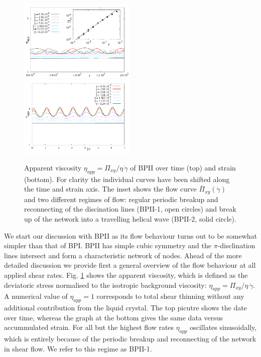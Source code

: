 \documentclass[aps,pre,reprint,superscriptaddress, twocolumn]{revtex4}
\newcommand{\gd}{\dot{\gamma}}
\begin{document}
\begin{figure}[htpb]
\includegraphics[width=0.495\textwidth]{stress_bp2.pdf}
\includegraphics[width=0.495\textwidth]{stress_vs_strain_bp2.pdf}
\caption{Apparent viscosity $\eta_{app}=\Pi_{xy}/\eta\,\gd$ of BPII over time (top) and strain (bottom). 
For clarity the individual curves have been shifted along the time and strain axis. 
The inset shows the flow curve $\bar{\Pi}_{xy}(\gd)$ and two different regimes of flow: 
regular periodic breakup and reconnecting of the discination lines (BPII-1, open circles) 
and break up of the network into a travelling helical wave (BPII-2, solid circle).}
\label{bp2-rheo}
\end{figure}

We start our discussion with BPII as its flow behaviour turns out to be somewhat simpler 
than that of BPI. BPII has simple cubic symmetry and the $\pi$-disclination lines intersect and form a characteristic network of nodes.
Ahead of the more detailed discussion we provide first a general overview of the flow behaviour at all applied shear rates.
Fig. \ref{bp2-rheo} shows the apparent viscosity, which is defined as the 
deviatoric stress normalised to the isotropic background viscosity: 
$\eta_{app}=\Pi_{xy}/\eta\,\gd$.
A numerical value of $\eta_{app}=1$ corresponds to total shear thinning without 
any additional contribution from the liquid crystal.
The top picutre shows the date over time, whereas the graph at the bottom gives 
the same data versus accummulated strain.
For all but the highest flow rates $\eta_{app}$ oscillates sinusoidally, which
is entirely because of the periodic breakup and reconnecting of the network in shear flow. We refer to this regime as BPII-1.
\end{document}
